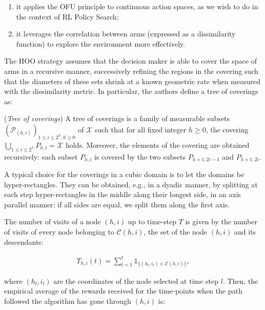 \begin{enumerate}
\item it applies the \gls{OFU} principle to continuous action spaces, as we wish to do in the context of \gls{RL} Policy Search;
\item it leverages the correlation between arms (expressed as a dissimilarity function) to explore the environment more effectively.
\end{enumerate} 

The \gls{HOO} strategy assumes that the decision maker is able to cover the space of arms in a recursive manner, successively refining the regions in the covering such that the diameters of these sets shrink at a known geometric rate when measured with the dissimilarity metric. In particular, the authors define a tree of coverings as:

\begin{definition} \label{def:treeofcoverings}
(\emph{Tree of coverings}) A tree of coverings is a family of measurable subsets $(\mathcal{P}_{(h,i)})_{1\leq i\leq 2^h, h\geq 0}$ of $\mathcal{X}$ such that for all fixed integer $h\geq 0$, the covering $\bigcup_{1\leq i\leq 2^h}P_{h,i}=\mathcal{X}$ holds. Moreover, the elements of the covering are obtained recursively: each subset $P_{h,i}$ is covered by the two subsets $P_{h+1,2i-1}$ and $P_{h+1,2i}$.
\end{definition}

\begin{remark}
A typical choice for the coverings in a cubic domain is to let the domains be hyper-rectangles. They can be obtained, e.g., in a dyadic manner, by splitting at each step hyper-rectangles in the middle along their longest side, in an axis parallel manner; if all sides are equal, we split them along the first axis.
\end{remark} 

The number of visits of a node $(h,i)$ up to time-step $T$ is given by the number of visits of every node belonging to $\mathcal{C}(h,i)$, \ie the set of the node $(h,i)$ and its descendants:

\begin{align}
T_{h,i}(t) = \sum_{l=1}^{t}\mathds{1}_{\{(h_l, i_l)\in\mathcal{C}(h,i)\}},
\end{align}

where $(h_l, i_l)$ are the coordinates of the node selected at time step $l$. Then, the empirical average of the rewards received for the time-points when the path followed the algorithm has gone through $(h,i)$ is:

